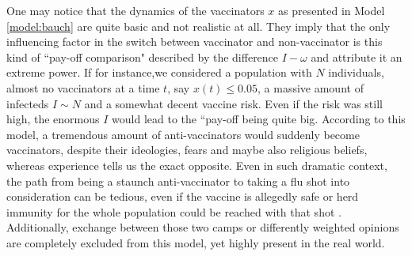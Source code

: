 \documentclass[12pt,a4paper,twoside]{article}
\begin{document}
One may notice that the dynamics of the vaccinators $x$ as presented in Model \ref{model:bauch} are quite basic and not realistic at all. They imply that the only influencing factor in the switch between vaccinator and non-vaccinator is this kind of ``pay-off comparison" described by the difference $I - \omega$ and attribute it an extreme power. If for instance,we considered a population with $N$ individuals, almost no vaccinators at a time $t$, say $x(t) \leq 0.05$, a massive amount of infecteds $I \sim N$ and a somewhat decent vaccine risk. Even if the risk was still high, the enormous $I$ would lead to the ``pay-off being quite big. According to this model, a tremendous amount of anti-vaccinators would suddenly become vaccinators, despite their ideologies, fears and maybe also religious beliefs, whereas experience tells us the exact opposite. Even in such dramatic context, the path from being a staunch anti-vaccinator to taking a flu shot into consideration can be tedious, even if the vaccine is allegedly safe or herd immunity for the whole population could be reached with that shot \cite{Bednarz2020, Health2019}. Additionally, exchange between those two camps or differently weighted opinions are completely excluded from this model, yet highly present in the real world.
\end{document}
